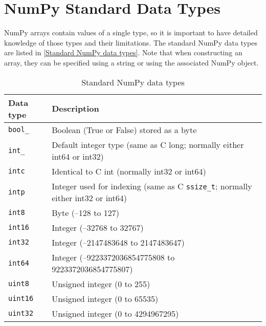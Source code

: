 \section{NumPy Standard Data Types}
NumPy arrays contain values of a single type, so it is important to have detailed knowledge of those types and their limitations. The standard NumPy data types are listed in \autoref{Standard NumPy data types}. Note that when constructing an array, they can be specified using a string or using the associated NumPy object.
\begin{table}
    \centering
    \caption{Standard NumPy data types}
    \label{Standard NumPy data types}
    \begin{tabular}{ll}
        \hline
        Data type         & Description                                                                          \\
        \hline
        \verb|bool_|      & Boolean (True or False) stored as a byte                                             \\
        \verb|int_|       & Default integer type (same as C long; normally either int64 or int32)                \\
        \verb|intc|       & Identical to C int (normally int32 or int64)                                         \\
        \verb|intp|       & Integer used for indexing (same as C \verb|ssize_t|; normally either int32 or int64) \\
        \verb|int8|       & Byte (–128 to 127)                                                                   \\
        \verb|int16|      & Integer (–32768 to 32767)                                                            \\
        \verb|int32|      & Integer (–2147483648 to 2147483647)                                                  \\
        \verb|int64|      & Integer (–9223372036854775808 to 9223372036854775807)                                \\
        \verb|uint8|      & Unsigned integer (0 to 255)                                                          \\
        \verb|uint16|     & Unsigned integer (0 to 65535)                                                        \\
        \verb|uint32|     & Unsigned integer (0 to 4294967295)                                                   \\

\end{tabular}
\end{table}
